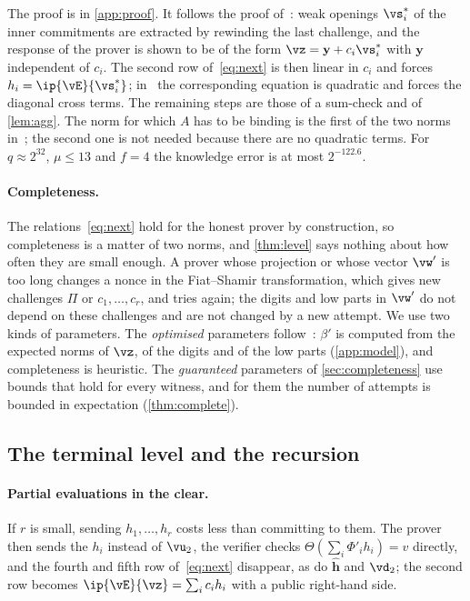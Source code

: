 The proof is in \cref{app:proof}. It follows the proof of~\cite[Theorem~5.1]{BS23}: weak openings $\vs^*_i$ of the inner commitments are extracted by rewinding the last challenge, and the response of the prover is shown to be of the form $\vz=\mathbf y+c_i\vs^*_i$ with $\mathbf y$ independent of $c_i$. The second row of~\eqref{eq:next} is then linear in $c_i$ and forces $h_i=\ip{\vE}{\vs^*_i}$; in~\cite{BS23} the corresponding equation is quadratic and forces the diagonal cross terms. The remaining steps are those of a sum-check and of \cref{lem:agg}. The norm for which $A$ has to be binding is the first of the two norms in~\cite[Theorem~5.1]{BS23}; the second one is not needed because there are no quadratic terms. For $q\approx2^{32}$, $\mu\le13$ and $f=4$ the knowledge error is at most $2^{-122.6}$.

\paragraph{Completeness.}
The relations~\eqref{eq:next} hold for the honest prover by construction, so completeness is a matter of two norms, and \cref{thm:level} says nothing about how often they are small enough. A prover whose projection or whose vector $\vw'$ is too long changes a nonce in the Fiat--Shamir transformation, which gives new challenges $\Pi$ or $c_1,\dots,c_r$, and tries again; the digits and low parts in $\vw'$ do not depend on these challenges and are not changed by a new attempt. We use two kinds of parameters. The \emph{optimised} parameters follow~\cite{BS23}: $\beta'$ is computed from the expected norms of $\vz$, of the digits and of the low parts (\cref{app:model}), and completeness is heuristic. The \emph{guaranteed} parameters of \cref{sec:completeness} use bounds that hold for every witness, and for them the number of attempts is bounded in expectation (\cref{thm:complete}).

\subsection{The terminal level and the recursion}\label{sec:terminal}

\paragraph{Partial evaluations in the clear.}
If $r$ is small, sending $h_1,\dots,h_r$ costs less than committing to them. The prover then sends the $h_i$ instead of $\vu_2$, the verifier checks $\Theta(\sum_i\Phi'_ih_i)=v$ directly, and the fourth and fifth row of~\eqref{eq:next} disappear, as do $\hat{\mathbf h}$ and $\vd_2$; the second row becomes $\ip{\vE}{\vz}=\sum_ic_ih_i$ with a public right-hand side.

